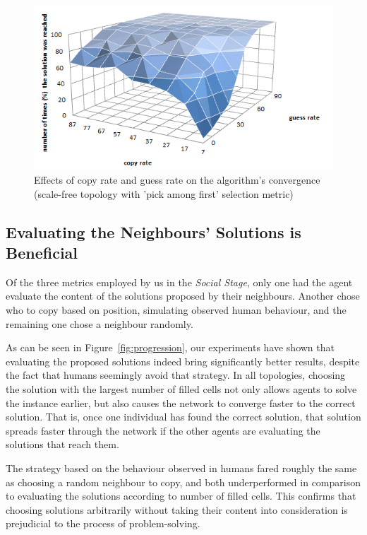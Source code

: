 \documentclass[letterpaper]{article}
\begin{document}
\begin{figure}
\centering
\includegraphics[scale=0.60]{copy_guess_free_prob_num_solution_reached}
\caption{Effects of copy rate and guess rate on the algorithm's convergence (scale-free topology with 'pick among first' selection metric)
}
\label{fig:copy_guess_free_prob_num_solution_reached}
\end{figure}

\subsection{Evaluating the Neighbours' Solutions is Beneficial}

Of the three metrics employed by us in the \emph{Social Stage}, only one had the agent evaluate the content of the solutions proposed by their neighbours. Another chose who to copy based on position, simulating observed human behaviour, and the remaining one chose a neighbour randomly.

As can be seen in Figure~\ref{fig:progression}, our experiments have shown that evaluating the proposed solutions indeed bring significantly better results, despite the fact that humans seemingly avoid that strategy. In all topologies, choosing the solution with the largest number of filled cells not only allows agents to solve the instance earlier, but also causes the network to converge faster to the correct solution. That is, once one individual has found the correct solution, that solution spreads faster through the network if the other agents are evaluating the solutions that reach them.

The strategy based on the behaviour observed in humans fared roughly the same as choosing a random neighbour to copy, and both underperformed in comparison to evaluating the solutions according to number of filled cells. This confirms that choosing solutions arbitrarily without taking their content into consideration is prejudicial to the process of problem-solving.
\end{document}
